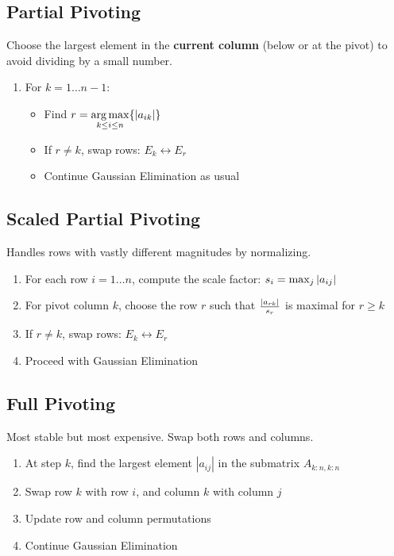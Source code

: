 \documentclass[9pt, letterpaper]{extarticle}
\begin{document}
\begin{multicols*}{3}
  \subsection{Partial Pivoting}
  Choose the largest element in the \textbf{current column} (below or at the pivot) to avoid dividing by a small number.
  \begin{enumerate}
    \item For $k = 1 \dots n-1$:
      \begin{itemize}
        \item Find $r = \underset{k \leq i \leq n}{\arg\max} \Bqty{|a_{ik}|}$
        \item If $r \neq k$, swap rows: $E_k \leftrightarrow E_r$
        \item Continue Gaussian Elimination as usual
      \end{itemize}
  \end{enumerate}

  \subsection{Scaled Partial Pivoting}
  Handles rows with vastly different magnitudes by normalizing.
  \begin{enumerate}
    \item For each row $i = 1 \dots n$, compute the scale factor: $s_i = \max_j \abs{a_{ij}}$
    \item For pivot column $k$, choose the row $r$ such that $\frac{\abs{a_{rk}}}{s_r}$ is maximal for $r \geq k$
    \item If $r \neq k$, swap rows: $E_k \leftrightarrow E_r$
    \item Proceed with Gaussian Elimination
  \end{enumerate}

  \subsection{Full Pivoting}
  Most stable but most expensive. Swap both rows and columns.
  \begin{enumerate}
    \item At step $k$, find the largest element $|a_{ij}|$ in the submatrix $A_{k:n,k:n}$
    \item Swap row $k$ with row $i$, and column $k$ with column $j$
    \item Update row and column permutations
    \item Continue Gaussian Elimination
  \end{enumerate}


\end{multicols*}
\end{document}
